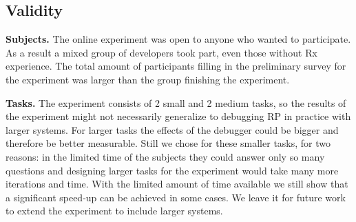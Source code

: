 \subsection{Validity}
\textbf{Subjects.} The online experiment was open to anyone who wanted to participate. As a result a mixed group of developers took part, even those without Rx experience. The total amount of participants filling in the preliminary survey for the experiment was larger than the group finishing the experiment.

\textbf{Tasks.} The experiment consists of 2 small and 2 medium tasks, so the results of the experiment might not necessarily generalize to debugging RP in practice with larger systems. For larger tasks the effects of the debugger could be bigger and therefore be better measurable. Still we chose for these smaller tasks, for two reasons: in the limited time of the subjects they could answer only so many questions and designing larger tasks for the experiment would take many more iterations and time. With the limited amount of time available we still show that a significant speed-up can be achieved in some cases. We leave it for future work to extend the experiment to include larger systems.
